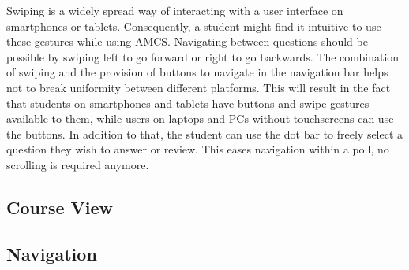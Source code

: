 Swiping is a widely spread way of interacting with a user interface on smartphones or tablets. Consequently, a student might find it intuitive to use these gestures while using AMCS. Navigating between questions should be possible by swiping left to go forward or right to go backwards. The combination of swiping and the provision of buttons to navigate in the navigation bar helps not to break uniformity between different platforms. This will result in the fact that students on smartphones and tablets have buttons and swipe gestures available to them, while users on laptops and PCs without touchscreens can use the buttons.
In addition to that, the student can use the dot bar to freely select a question they wish to answer or review. This eases navigation within a poll, no scrolling is required anymore.


\subsection{Course View}
\subsection{Navigation}

